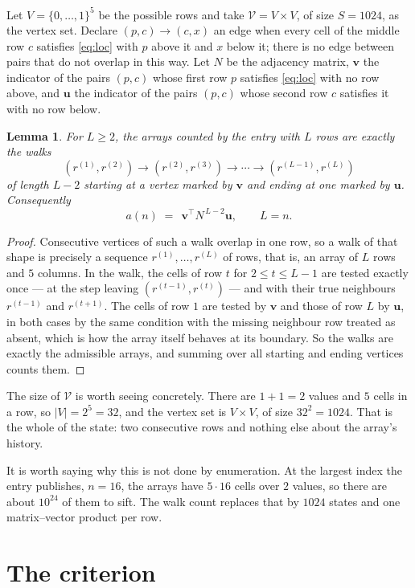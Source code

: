 \documentclass[11pt,a4paper]{article}
\theoremstyle{plain}
\newtheorem{lemma}[theorem]{Lemma}
\theoremstyle{definition}
\begin{document}
Let $V=\{0,\dots,1\}^{5}$ be the possible rows and take
$\mathcal V=V\times V$, of size $S=1024$, as the vertex set. Declare $(p,c)\to(c,x)$ an edge
when every cell of the middle row $c$ satisfies \eqref{eq:loc} with $p$ above it and $x$
below it; there is no edge between pairs that do not overlap in this way. Let $N$ be the
adjacency matrix, $\mathbf{v}$ the indicator of the pairs $(p,c)$ whose first row $p$
satisfies \eqref{eq:loc} with no row above, and $\mathbf{u}$ the indicator of
the pairs $(p,c)$ whose second row $c$ satisfies it with no row below.

\begin{lemma}\label{lem:walk}
For $L\ge2$, the arrays counted by the entry with $L$ rows are exactly the walks
\[
(r^{(1)},r^{(2)})\to(r^{(2)},r^{(3)})\to\cdots\to(r^{(L-1)},r^{(L)})
\]
of length $L-2$ starting at a vertex marked by $\mathbf{v}$ and ending at one marked by
$\mathbf{u}$. Consequently
\[
a(n)\;=\;\,\mathbf{v}^{\!\top}N^{\,L-2}\mathbf{u},\qquad L=n .
\]
\end{lemma}

\begin{proof}
Consecutive vertices of such a walk overlap in one row, so a walk of that shape is
precisely a sequence $r^{(1)},\dots,r^{(L)}$ of rows, that is, an array of $L$ rows
and $5$ columns. In the walk, the cells of row $t$ for $2\le t\le L-1$ are tested
exactly once --- at the step leaving $(r^{(t-1)},r^{(t)})$ --- and with their true
neighbours $r^{(t-1)}$ and $r^{(t+1)}$. The cells of row $1$ are tested by
$\mathbf{v}$ and those of row $L$ by $\mathbf{u}$, in both cases by the same condition
with the missing neighbour row treated as absent, which is how the array itself behaves at
its boundary. So the walks are exactly the admissible arrays, and summing over all starting
and ending vertices counts them.
\end{proof}


The size of $\mathcal V$ is worth seeing concretely. There are $1+1=2$ values
and $5$ cells in a row, so $|V|=2^{5}=32$, and the vertex set is
$V\times V$, of size $32^2=1024$. That is the whole of the state: two consecutive
rows and nothing else about the array's history.

It is worth saying why this is not done by enumeration. At the largest index the entry
publishes, $n=16$, the arrays have $5\cdot16$ cells over
$2$ values, so there are about $10^{24}$ of them to sift. The
walk count replaces that by $1024$ states and one matrix--vector product per row.
\section{The criterion}
\end{document}
